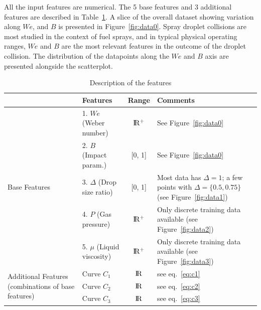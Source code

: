 \documentclass{article}
\begin{document}
All the input features are numerical. The 5 base features and 3 additional features are described in Table~\ref{tab:features}. A slice of the overall dataset showing variation along $We$, and $B$ is presented in Figure~\ref{fig:data0}. Spray droplet collisions are most studied in the context of fuel sprays, and in typical physical operating ranges, $We$ and $B$ are the most relevant features in the outcome of the droplet collision. The distribution of the datapoints along the $We$ and $B$ axis are presented alongside the scatterplot.

\begin{table}[h]
  \caption{Description of the features}
  \label{tab:features}
  \centering
  \begin{tabular}{l l c p{5cm}}
    \toprule
    & 							Features		  			& Range & Comments\\
    \midrule
   \multirow{ 5}{*}{Base Features} 	& 1. $We$ (Weber number)      	& $\rm I\!R^+$ 	& See Figure~\ref{fig:data0}  \\
     							& 2. $B$ (Impact param.)		& [0, 1]  			& See Figure~\ref{fig:data0} \\
    							& 3. $\Delta$ (Drop size ratio)  	& [0, 1]  			& Most data has $\Delta = 1$; a few points with $\Delta = \{0.5, 0.75\}$ (see Figure~\ref{fig:data1})   \\
    							& 4. $P$ (Gas pressure) 		& $\rm I\!R^+$	&  Only discrete training data available (see Figure~\ref{fig:data2})\\
    							& 5. $\mu$ (Liquid viscosity) 		& $\rm I\!R^+$ 	& Only discrete training data available (see Figure~\ref{fig:data3}) \\
   \midrule
   \multirow{ 3}{3cm}{Additional Features (combinations of base features)} 	& Curve $C_1$     			& $\rm I\!R$ &  see eq.~\ref{eq:c1}\\
     							& Curve $C_2$					& $\rm I\!R$  & see eq.~\ref{eq:c2} \\
    							& Curve $C_3$  					& $\rm I\!R$  & see eq.~\ref{eq:c3}\\
    \bottomrule
  \end{tabular}
\end{table}
\end{document}
